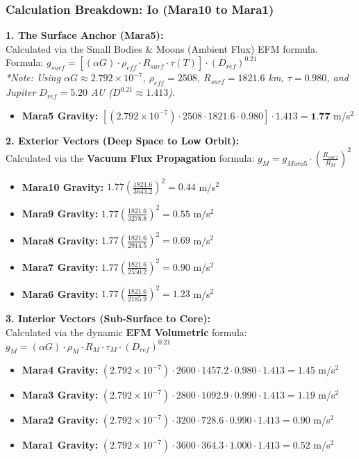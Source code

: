 \documentclass[11pt, a4paper]{article}
\begin{document}
\clearpage
\subsubsection{Calculation Breakdown: Io (Mara10 to Mara1)}

\noindent \textbf{1. The Surface Anchor (Mara5):} \\
Calculated via the Small Bodies \& Moons (Ambient Flux) EFM formula. \\
Formula: $g_{surf} = \left[ (\alpha G) \cdot \rho_{eff} \cdot R_{surf} \cdot \tau(T) \right] \cdot (D_{ref})^{0.21}$ \\
\textit{*Note: Using $\alpha G \approx 2.792 \times 10^{-7}$, $\rho_{eff} = 2508$, $R_{surf} = 1821.6$ km, $\tau = 0.980$, and Jupiter $D_{ref} = 5.20$ AU ($D^{0.21} \approx 1.413$).}
\begin{itemize}
  \item \textbf{Mara5 Gravity:} $\left[ (2.792 \times 10^{-7}) \cdot 2508 \cdot 1821.6 \cdot 0.980 \right] \cdot 1.413 = \textbf{1.77}$ m/s$^2$
\end{itemize}

\vspace{0.5em}
\noindent \textbf{2. Exterior Vectors (Deep Space to Low Orbit):} \\
Calculated via the \textbf{Vacuum Flux Propagation} formula: $g_M = g_{Mara5} \cdot \left( \frac{R_{surf}}{R_M} \right)^2$
\begin{itemize}
  \item \textbf{Mara10 Gravity:} $1.77 \left( \frac{1821.6}{3643.2} \right)^2 = 0.44$ m/s$^2$
  \item \textbf{Mara9 Gravity:} $1.77 \left( \frac{1821.6}{3278.8} \right)^2 = 0.55$ m/s$^2$
  \item \textbf{Mara8 Gravity:} $1.77 \left( \frac{1821.6}{2914.5} \right)^2 = 0.69$ m/s$^2$
  \item \textbf{Mara7 Gravity:} $1.77 \left( \frac{1821.6}{2550.2} \right)^2 = 0.90$ m/s$^2$
  \item \textbf{Mara6 Gravity:} $1.77 \left( \frac{1821.6}{2185.9} \right)^2 = 1.23$ m/s$^2$
\end{itemize}

\vspace{0.5em}
\noindent \textbf{3. Interior Vectors (Sub-Surface to Core):} \\
Calculated via the dynamic \textbf{EFM Volumetric} formula: $g_M = (\alpha G) \cdot \rho_{M} \cdot R_M \cdot \tau_M \cdot (D_{ref})^{0.21}$
\begin{itemize}
  \item \textbf{Mara4 Gravity:} $(2.792 \times 10^{-7}) \cdot 2600 \cdot 1457.2 \cdot 0.980 \cdot 1.413 = 1.45$ m/s$^2$
  \item \textbf{Mara3 Gravity:} $(2.792 \times 10^{-7}) \cdot 2800 \cdot 1092.9 \cdot 0.990 \cdot 1.413 = 1.19$ m/s$^2$
  \item \textbf{Mara2 Gravity:} $(2.792 \times 10^{-7}) \cdot 3200 \cdot 728.6 \cdot 0.990 \cdot 1.413 = 0.90$ m/s$^2$
  \item \textbf{Mara1 Gravity:} $(2.792 \times 10^{-7}) \cdot 3600 \cdot 364.3 \cdot 1.000 \cdot 1.413 = 0.52$ m/s$^2$
\end{itemize}
\end{document}
